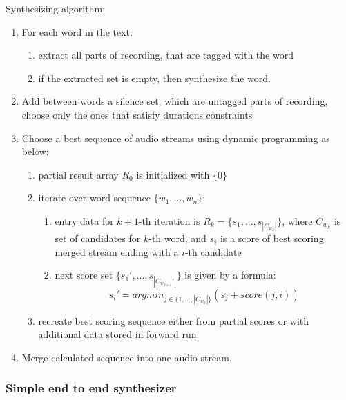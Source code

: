 \documentclass[12pt,a4paper,english]{article}
\begin{document}
Synthesizing algorithm:
\begin{enumerate}
    \item For each word in the text:
        \begin{enumerate}
            \item extract all parts of recording, that are tagged with the word
            \item if the extracted set is empty, then synthesize the word.
        \end{enumerate}
    \item Add between words a silence set, which are untagged parts of recording, \newline
          choose only the ones that satisfy durations constraints
    \item Choose a best sequence of audio streams using dynamic programming as below:
        \begin{enumerate}
            \item partial result array $R_0$ is initialized with $\{0\}$
            \item iterate over word sequence $\{w_1, ..., w_n\}$:
                \begin{enumerate}
                    \item entry data for $k+1$-th iteration is $R_k = \{s_1, ..., s_{|C_{w_k}|}\}$,
                    where $C_{w_k}$ is set of candidates for $k$-th word,
                    and $s_i$ is a score of best scoring merged stream ending with a $i$-th candidate
                    \item next score set $\{s_1', ..., s_{|C_{w_{k+1}}'|}\}$ is given by a formula:
                    \begin{equation}
                        s_i' = argmin_{j \in \{1,...,|C_{w_k}|\}} (s_j + score(j, i))
                    \end{equation}
                \end{enumerate}
            \item recreate best scoring sequence either from partial scores or with additional data stored in forward run
        \end{enumerate}
    \item Merge calculated sequence into one audio stream.
\end{enumerate}

\newpage

\subsubsection{Simple end to end synthesizer}
\end{document}
